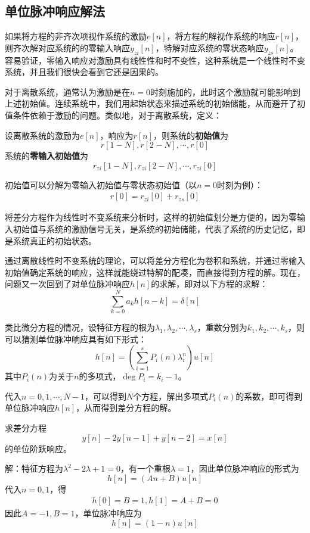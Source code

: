 \subsection{单位脉冲响应解法}\label{sub:h_solution}

如果将方程的非齐次项视作系统的激励$e[n]$，将方程的解视作系统的响应$r[n]$，则齐次解对应系统的的零输入响应$y_{zi}[n]$，特解对应系统的零状态响应$y_{zs}[n]$。容易验证，零输入响应对激励具有线性性和时不变性，这种系统是一个线性时不变系统，并且我们很快会看到它还是因果的。

对于离散系统，通常认为激励是在$n=0$时刻施加的，此时这个激励就可能影响到上述初始值。连续系统中，我们用起始状态来描述系统的初始储能，从而避开了初值条件依赖于激励的问题。类似地，对于离散系统，定义：
\begin{definition}[离散系统的初始值与零输入初始值]
    设离散系统的激励为$e[n]$，响应为$r[n]$，则系统的\textbf{初始值}为
    $$r[1-N],r[2-N],\cdots,r[0]$$
    系统的\textbf{零输入初始值}为
    $$r_{zi}[1-N],r_{zi}[2-N],\cdots,r_{zi}[0]$$
\end{definition}

初始值可以分解为零输入初始值与零状态初始值（以$n=0$时刻为例）：
\begin{align*}
    r[0]=r_{zi}[0]+r_{zs}[0]
\end{align*}

将差分方程作为线性时不变系统来分析时，这样的初始值划分是方便的，因为零输入初始值与系统的激励信号无关，是系统的初始储能，代表了系统的历史记忆，即是系统真正的初始状态。

通过离散线性时不变系统的理论，可以将差分方程化为卷积和系统，并通过零输入初始值确定系统的响应，这样就能绕过特解的配凑，而直接得到方程的解。现在，问题又一次回到了对单位脉冲响应$h[n]$的求解，即对以下方程的求解：
$$\sum_{k=0}^{N}a_k h[n-k] = \delta[n]$$

类比微分方程的情况，设特征方程的根为$\lambda_1,\lambda_2,\cdots,\lambda_s$，重数分别为$k_1,k_2,\cdots,k_s$，则可以猜测单位脉冲响应具有如下形式：
$$h[n]=\left(\sum_{i=1}^s P_i(n) \lambda_i^n \right)u[n]$$
其中$P_i(n)$为关于$n$的多项式，$\deg P_i=k_i-1$。

代入$n=0,1,\cdots,N-1$，可以得到$N$个方程，解出多项式$P_i(n)$的系数，即可得到单位脉冲响应$h[n]$，从而得到差分方程的解。

\begin{example}
    求差分方程
    $$y[n]-2y[n-1]+y[n-2]=x[n]$$
    的单位阶跃响应。

    解：特征方程为$\lambda^2-2\lambda+1=0$，有一个重根$\lambda=1$，因此单位脉冲响应的形式为
    $$h[n]=(A n+B)u[n]$$
    代入$n=0,1$，得\begin{align*}
    h[0]=B=1,h[1]=A+B=0
    \end{align*}
    因此$A=-1,B=1$，单位脉冲响应为
    $$h[n]=(1-n)u[n]$$
\end{example}

